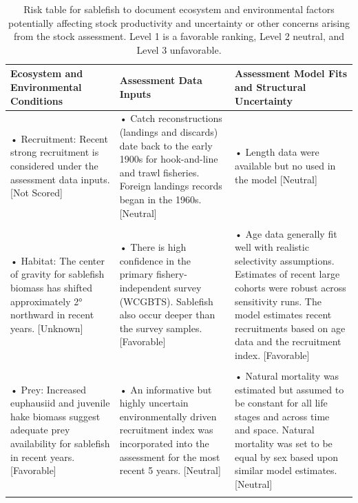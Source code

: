 \documentclass[
  english,
]{article}
\begin{document}
\begin{longtable}{>{\raggedright\arraybackslash}p{\dimexpr 142.50pt -2\tabcolsep-1.5\arrayrulewidth}>{\raggedright\arraybackslash}p{\dimexpr 142.50pt -2\tabcolsep-1.5\arrayrulewidth}>{\raggedright\arraybackslash}p{\dimexpr 142.50pt -2\tabcolsep-1.5\arrayrulewidth}}

\caption{\label{tbl-risk-table}Risk table for sablefish to document
ecosystem and environmental factors potentially affecting stock
productivity and uncertainty or other concerns arising from the stock
assessment. Level 1 is a favorable ranking, Level 2 neutral, and Level 3
unfavorable.}

\tabularnewline

\toprule
Ecosystem and Environmental Conditions & Assessment Data Inputs & Assessment Model Fits and Structural Uncertainty \\ 
\midrule\addlinespace[2.5pt]
• Recruitment: Recent strong recruitment is considered under the assessment data inputs. [Not Scored] & • Catch reconstructions (landings and
discards) date back to the early 1900s for hook-and-line and trawl fisheries. Foreign landings records began in the 1960s. [Neutral] & • Length data were available but no used in the model [Neutral] \\ 
 &  &  \\ 
• Habitat: The center of gravity for sablefish biomass has shifted approximately 2° northward in recent years. [Unknown]  & • There is high confidence in the primary fishery-independent survey (WCGBTS). Sablefish also occur deeper than the survey samples. [Favorable] & • Age data generally fit well with realistic selectivity assumptions. Estimates of recent large cohorts were robust across sensitivity runs. The model estimates recent recruitments based on age data and the recruitment index. [Favorable]  \\ 
 &  &  \\ 
• Prey: Increased euphausiid and juvenile hake biomass suggest adequate prey availability for sablefish in recent years. [Favorable] & • An informative but highly uncertain environmentally driven recruitment index was incorporated into the assessment for the most recent 5 years. [Neutral] & • Natural mortality was estimated but assumed to be constant for all life stages and across time and space. Natural mortality was set to be equal by sex based upon similar model estimates. [Neutral] \\ 
 &  &  \\ 

\end{longtable}
\end{document}
